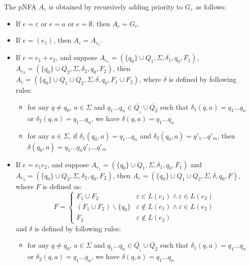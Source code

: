 The pNFA $A_e$ is obtained by recursively adding priority to $G_e$ as follows:
\begin{itemize}
  \item If $e = \varepsilon$ or $e = a$ or $e = \emptyset$, then $A_e = G_e$.
  
  \item If $e = (e_1)$, then $A_e = A_{e_1}$.
  
  \item If $e = e_1 + e_2$, and suppose $A_{e_1} = (\{ q_0 \} \cup Q_1,
  \Sigma, \delta_1, q_0, F_1)$, $A_{e_2} = (\{ q_0 \} \cup Q_2, \Sigma,
  \delta_2, q_0, F_2)$, then $A_e = (\{ q_0 \} \cup Q_1 \cup Q_2, \Sigma,
  \delta, q_0, F_1 \cup F_2)$, where $\delta$ is defined by following rules:
  \begin{itemize}
    \item for any $q \neq q_0$, $a \in \Sigma$ and $q_1 \ldots q_n \in
    \overline{Q_{_1}} \cup \overline{Q_2}$ such that $\delta_1 (q, a) = q_1
    \ldots q_n$ or $\delta_2 (q, a) = q_1 \ldots q_n$, we have $\delta (q, a)
    = q_1 \ldots q_n$
    
    \item for any $a \in \Sigma$, if $\delta_1 (q_0, a) = q_1 \ldots q_n$ and
    $\delta_2 (q_0, a) = q'_1 \ldots q'_m$, then $\delta (q_0, a) = q_1 \ldots
    q_n q'_1 \ldots q'_m$
  \end{itemize}
  \item If $e = e_1 e_2$, and suppose $A_{e_1} = (\{ q_0 \} \cup Q_1, \Sigma,
  \delta_1, q_0, F_1)$ and $A_{e_2} = (\{ q_0 \} \cup Q_2, \Sigma, \delta_2,
  q_0, F_2)$, then $A_e = (\{ q_0 \} \cup Q_1 \cup Q_2, \Sigma, \delta, q_0,
  F)$, where $F$ is defined as:
  \[ F = \left\{ \begin{array}{ll}
       F_1 \cup F_2 & \varepsilon \in L (e_1) \wedge \varepsilon \in L (e_2)\\
       (F_1 \cup F_2) \backslash \{ q_0 \} & \varepsilon \nin L (e_1) \wedge
       \varepsilon \in L (e_2)\\
       F_2 & \varepsilon \nin L (e_2)
     \end{array} \right. \]
  and $\delta$ is defined by following rules:
  \begin{itemize}
    \item for any $q \neq q_0$, $a \in \Sigma$ and $q_1 \ldots q_n \in
    \overline{Q_{_1}} \cup \overline{Q_2}$ such that $\delta_1 (q, a) = q_1
    \ldots q_n$ or $\delta_2 (q, a) = q_1 \ldots q_n$, we have $\delta (q, a)
    = q_1 \ldots q_n$
    

\end{itemize}
\end{itemize}
